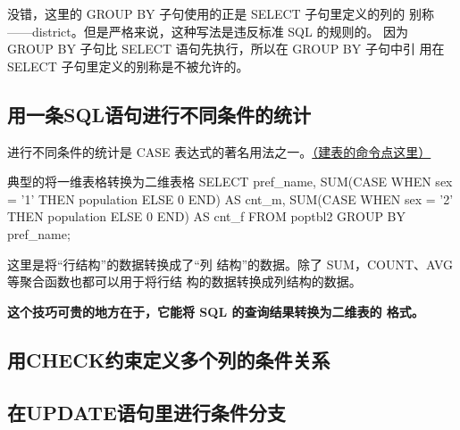 没错，这里的 GROUP BY 子句使用的正是 SELECT 子句里定义的列的
别称——district。但是严格来说，这种写法是违反标准 SQL 的规则的。
因为 GROUP BY 子句比 SELECT 语句先执行，所以在 GROUP BY 子句中引
用在 SELECT 子句里定义的别称是不被允许的。

\subsection{用一条SQL语句进行不同条件的统计}
进行不同条件的统计是 CASE 表达式的著名用法之一。\href{https://github.com/JPL-JUNO/SQL/blob/main/ASQLP/PopTbl2.sql}{（建表的命令点这里）}
\begin{sql}{典型的将一维表格转换为二维表格}
SELECT
    pref_name,
    SUM(CASE WHEN sex = '1' THEN population ELSE 0 END) AS cnt_m,
    SUM(CASE WHEN sex = '2' THEN population ELSE 0 END) AS cnt_f
FROM poptbl2
GROUP BY pref_name;
\end{sql}

这里是将“行结构”的数据转换成了“列
结构”的数据。除了 SUM，COUNT、AVG 等聚合函数也都可以用于将行结
构的数据转换成列结构的数据。

\textbf{这个技巧可贵的地方在于，它能将 SQL 的查询结果转换为二维表的
格式。}
\subsection{用CHECK约束定义多个列的条件关系}
\subsection{在UPDATE语句里进行条件分支}





